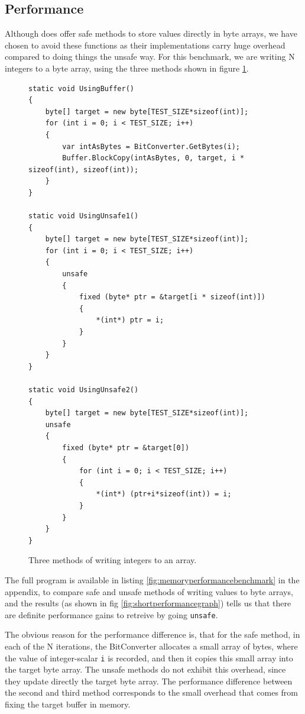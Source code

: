 \subsection{Performance}
\label{marshalunsafeperformance}
Although \csharp{} does offer safe methods to store values directly in byte
arrays, we have chosen to avoid these functions as their implementations carry
huge overhead compared to doing things the unsafe way.
For this benchmark, we are writing N integers to a byte array, using the three
methods shown in figure \ref{fig:threemethods}.
\begin{figure}[H]
  \centering
  \begin{verbatim}
static void UsingBuffer()
{
    byte[] target = new byte[TEST_SIZE*sizeof(int)];
    for (int i = 0; i < TEST_SIZE; i++)
    {
        var intAsBytes = BitConverter.GetBytes(i);
        Buffer.BlockCopy(intAsBytes, 0, target, i * sizeof(int), sizeof(int)); 
    }
}

static void UsingUnsafe1()
{
    byte[] target = new byte[TEST_SIZE*sizeof(int)];
    for (int i = 0; i < TEST_SIZE; i++)
    {
        unsafe
        {
            fixed (byte* ptr = &target[i * sizeof(int)])
            {
                *(int*) ptr = i;
            }
        }
    }
}

static void UsingUnsafe2()
{
    byte[] target = new byte[TEST_SIZE*sizeof(int)];
    unsafe
    {
        fixed (byte* ptr = &target[0])
        {
            for (int i = 0; i < TEST_SIZE; i++)
            {
                *(int*) (ptr+i*sizeof(int)) = i;
            }
        }
    }
}

\end{verbatim}
  \caption{Three methods of writing integers to an array.}
  \label{fig:threemethods}
\end{figure}


The full program is available in listing \ref{fig:memoryperformancebenchmark} in the
appendix, to compare safe and unsafe methods of writing values to byte arrays, and the
results (as shown in fig \ref{fig:shortperformancegraph}) tells us that there
are definite performance gains to retreive by going \texttt{unsafe}.

The obvious reason for the performance difference is, that for the safe
method, in each of the N iterations, the BitConverter allocates a small 
array of bytes, where the value of integer-scalar {\tt i} is recorded,
and then it copies this small array into the target byte array. 
The unsafe methods do not exhibit this overhead, since they update directly
the target byte array. 
The performance difference between the second and third method corresponds to
the small overhead that comes from fixing the target buffer in memory.


